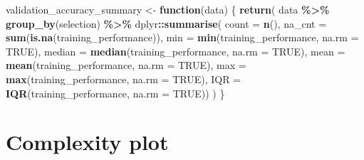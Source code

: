 \documentclass[
]{book}
\newenvironment{Shaded}{\begin{snugshade}}{\end{snugshade}}
\newcommand{\AttributeTok}[1]{\textcolor[rgb]{0.13,0.29,0.53}{#1}}
\newcommand{\ConstantTok}[1]{\textcolor[rgb]{0.56,0.35,0.01}{#1}}
\newcommand{\ControlFlowTok}[1]{\textcolor[rgb]{0.13,0.29,0.53}{\textbf{#1}}}
\newcommand{\FunctionTok}[1]{\textcolor[rgb]{0.13,0.29,0.53}{\textbf{#1}}}
\newcommand{\NormalTok}[1]{#1}
\newcommand{\OtherTok}[1]{\textcolor[rgb]{0.56,0.35,0.01}{#1}}
\newcommand{\SpecialCharTok}[1]{\textcolor[rgb]{0.81,0.36,0.00}{\textbf{#1}}}
\begin{document}
\begin{Shaded}
\begin{Highlighting}[]
\NormalTok{validation\_accuracy\_summary }\OtherTok{\textless{}{-}} \ControlFlowTok{function}\NormalTok{(data) \{}
    \FunctionTok{return}\NormalTok{(}
\NormalTok{        data }\SpecialCharTok{\%\textgreater{}\%}
        \FunctionTok{group\_by}\NormalTok{(selection) }\SpecialCharTok{\%\textgreater{}\%}
\NormalTok{        dplyr}\SpecialCharTok{::}\FunctionTok{summarise}\NormalTok{(}
            \AttributeTok{count =} \FunctionTok{n}\NormalTok{(),}
            \AttributeTok{na\_cnt =} \FunctionTok{sum}\NormalTok{(}\FunctionTok{is.na}\NormalTok{(training\_performance)),}
            \AttributeTok{min =} \FunctionTok{min}\NormalTok{(training\_performance, }\AttributeTok{na.rm =} \ConstantTok{TRUE}\NormalTok{),}
            \AttributeTok{median =} \FunctionTok{median}\NormalTok{(training\_performance, }\AttributeTok{na.rm =} \ConstantTok{TRUE}\NormalTok{),}
            \AttributeTok{mean =} \FunctionTok{mean}\NormalTok{(training\_performance, }\AttributeTok{na.rm =} \ConstantTok{TRUE}\NormalTok{),}
            \AttributeTok{max =} \FunctionTok{max}\NormalTok{(training\_performance, }\AttributeTok{na.rm =} \ConstantTok{TRUE}\NormalTok{),}
            \AttributeTok{IQR =} \FunctionTok{IQR}\NormalTok{(training\_performance, }\AttributeTok{na.rm =} \ConstantTok{TRUE}\NormalTok{))}
\NormalTok{    )}
\NormalTok{\}}
\end{Highlighting}
\end{Shaded}

\hypertarget{complexity-plot}{%
\section{Complexity plot}\label{complexity-plot}}
\end{document}
